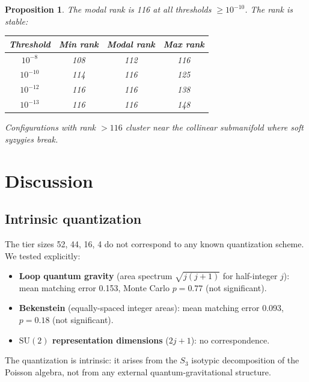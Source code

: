 \documentclass[11pt,a4paper]{article}
\newtheorem{proposition}[theorem]{Proposition}
\theoremstyle{remark}
\newcommand{\SG}{S_3}
\begin{document}
\begin{proposition}
\label{prop:rank-stability}
The modal rank is 116 at all thresholds $\ge 10^{-10}$.
The rank is stable:
\begin{center}
\begin{tabular}{@{}cccc@{}}
\toprule
Threshold & Min rank & Modal rank & Max rank \\
\midrule
$10^{-8}$ & 108 & 112 & 116 \\
$10^{-10}$ & 114 & 116 & 125 \\
$10^{-12}$ & 116 & 116 & 138 \\
$10^{-13}$ & 116 & 116 & 148 \\
\bottomrule
\end{tabular}
\end{center}
Configurations with rank $> 116$ cluster near the
collinear submanifold where soft syzygies break.
\end{proposition}


\section{Discussion}
\label{sec:discussion}

\subsection{Intrinsic quantization}

The tier sizes 52, 44, 16, 4 do not correspond to any
known quantization scheme.  We tested explicitly:

\begin{itemize}[nosep]
  \item \textbf{Loop quantum gravity} (area spectrum
    $\sqrt{j(j{+}1)}$ for half-integer $j$):
    mean matching error 0.153, Monte Carlo $p = 0.77$
    (not significant).
  \item \textbf{Bekenstein} (equally-spaced integer
    areas): mean matching error 0.093,
    $p = 0.18$ (not significant).
  \item \textbf{$\mathrm{SU}(2)$ representation dimensions}
    ($2j{+}1$): no correspondence.
\end{itemize}

The quantization is intrinsic: it arises from the
$\SG$ isotypic decomposition of the Poisson algebra,
not from any external quantum-gravitational structure.
\end{document}
